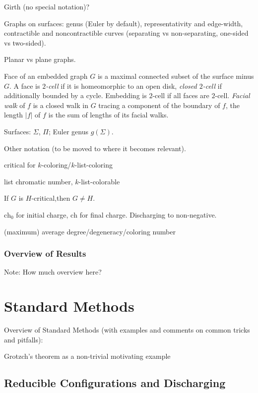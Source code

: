 \documentclass[12pt,twoside,openright,a4paper]{book}
\newcommand{\initch}{\text{ch}_0}
\newcommand{\finch}{\text{ch}}
\begin{document}
Girth (no special notation)?

Graphs on surfaces: genus (Euler by default), representativity and edge-width, contractible and
noncontractible curves (separating vs non-separating, one-sided vs two-sided).

Planar vs plane graphs.

Face of an embedded graph $G$ is a maximal connected subset of the surface minus $G$.
A face is \emph{$2$-cell} if it is homeomorphic to an open disk, \emph{closed $2$-cell}
if additionally bounded by a cycle.  Embedding is $2$-cell if all faces are $2$-cell.
\emph{Facial walk} of $f$ is a closed walk in $G$ tracing
a component of the boundary of $f$, the length $|f|$ of $f$ is the sum of lengths of its facial
walks.

Surfaces: $\Sigma$, $\Pi$; Euler genus $g(\Sigma)$.

Other notation (to be moved to where it becomes relevant).

critical for $k$-coloring/$k$-list-coloring

list chromatic number, $k$-list-colorable

If $G$ is $H$-critical,then $G\neq H$.

$\initch$ for initial charge, $\finch$ for final charge.  Discharging to non-negative.

(maximum) average degree/degeneracy/coloring number

\section{Overview of Results}

Note: How much overview here?

\part{Standard Methods}

Overview of Standard Methods (with examples and comments on common tricks and pitfalls):

Grotzch's theorem as a non-trivial motivating example

\chapter{Reducible Configurations and Discharging}

\end{document}

